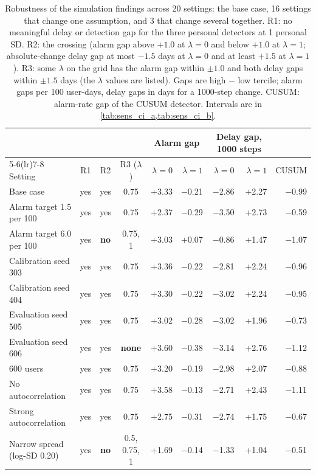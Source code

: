 \begin{table}[H]
\centering
\scriptsize
\caption{Robustness of the simulation findings across 20 settings: the base case, 16 settings that change one assumption, and 3 that change several together. R1: no meaningful delay or detection gap for the three personal detectors at 1 personal SD. R2: the crossing (alarm gap above $+1.0$ at $\lambda=0$ and below $+1.0$ at $\lambda=1$; absolute-change delay gap at most $-1.5$ days at $\lambda=0$ and at least $+1.5$ at $\lambda=1$). R3: some $\lambda$ on the grid has the alarm gap within $\pm 1.0$ and both delay gaps within $\pm 1.5$ days (the $\lambda$ values are listed). Gaps are high $-$ low tercile; alarm gaps per 100 user-days, delay gaps in days for a 1000-step change. CUSUM: alarm-rate gap of the CUSUM detector. Intervals are in \cref{tab:sens_ci_a,tab:sens_ci_b}.}
\label{tab:sens}
\begin{tabular}{@{}lcccrrrrr@{}}
\toprule
 & & & & \multicolumn{2}{c}{Alarm gap} & \multicolumn{2}{c}{Delay gap, 1000 steps} & \\
\cmidrule(lr){5-6}\cmidrule(lr){7-8}
Setting & R1 & R2 & R3 ($\lambda$) & $\lambda=0$ & $\lambda=1$ & $\lambda=0$ & $\lambda=1$ & CUSUM \\
\midrule
Base case & yes & yes & 0.75 & +3.33 & $-$0.21 & $-$2.86 & +2.27 & $-$0.99 \\
Alarm target 1.5 per 100 & yes & yes & 0.75 & +2.37 & $-$0.29 & $-$3.50 & +2.73 & $-$0.59 \\
Alarm target 6.0 per 100 & yes & \textbf{no} & 0.75, 1 & +3.03 & +0.07 & $-$0.86 & +1.47 & $-$1.07 \\
Calibration seed 303 & yes & yes & 0.75 & +3.36 & $-$0.22 & $-$2.81 & +2.24 & $-$0.96 \\
Calibration seed 404 & yes & yes & 0.75 & +3.30 & $-$0.22 & $-$3.02 & +2.24 & $-$0.95 \\
Evaluation seed 505 & yes & yes & 0.75 & +3.02 & $-$0.28 & $-$3.02 & +1.96 & $-$0.73 \\
Evaluation seed 606 & yes & yes & \textbf{none} & +3.60 & $-$0.38 & $-$3.14 & +2.76 & $-$1.12 \\
600 users & yes & yes & 0.75 & +3.20 & $-$0.19 & $-$2.98 & +2.07 & $-$0.88 \\
No autocorrelation & yes & yes & 0.75 & +3.58 & $-$0.13 & $-$2.71 & +2.43 & $-$1.11 \\
Strong autocorrelation & yes & yes & 0.75 & +2.75 & $-$0.31 & $-$2.74 & +1.75 & $-$0.67 \\
Narrow spread (log-SD 0.20) & yes & \textbf{no} & 0.5, 0.75, 1 & +1.69 & $-$0.14 & $-$1.33 & +1.04 & $-$0.51 \\

\end{tabular}
\end{table}
